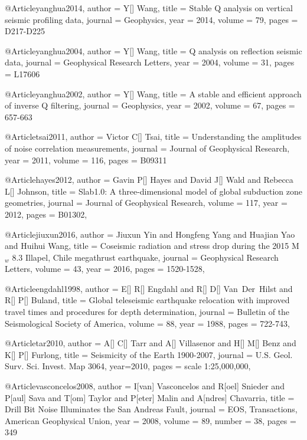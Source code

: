 @Article{yanghua2014,
  author = 	 {Y[] Wang},
  title = 	 {Stable Q analysis on vertical seismic profiling data},
  journal = 	 {Geophysics},
  year = 	 2014,
  volume =	 79,
  pages =	 {D217-D225}
}

@Article{yanghua2004,
  author = 	 {Y[] Wang},
  title = 	 {Q analysis on reflection seismic data},
  journal = 	 {Geophysical Research Letters},
  year = 	 2004,
  volume =	 31,
  pages =	 {L17606}
}

@Article{yanghua2002,
  author = 	 {Y[] Wang},
  title = 	 {A stable and efficient approach of inverse Q filtering},
  journal = 	 {Geophysics},
  year = 	 2002,
  volume = 67,
  pages =	 {657-663}
}

@Article{tsai2011,
  author = 	 {Victor C[] Tsai},
  title = 	 {Understanding the amplitudes of noise correlation measurements},
  journal = 	 {Journal of Geophysical Research},
  year = 	 2011,
  volume = 116,
  pages =	 {B09311}
}

@Article{hayes2012,
  author =	 { Gavin P[] Hayes and David J[] Wald and Rebecca L[] Johnson},
  title =	 {Slab1.0: A three-dimensional model of global subduction zone geometries},
  journal =	 {Journal of Geophysical Research},
  volume =	 117,
  year =	 2012,
  pages =	 {B01302},
}

@Article{jiuxun2016,
  author =	 { Jiuxun Yin and Hongfeng Yang and Huajian Yao and Huihui Wang},
  title =	 {Coseismic radiation and stress drop during the 2015 {M}$_w$ 8.3 {I}llapel, {C}hile megathrust earthquake},
  journal =	 {Geophysical Research Letters},
  volume =	 43,
  year =	 2016,
  pages =	 {1520-1528},
}

@Article{engdahl1998,
  author =	 {E[] R[] Engdahl and R[] D[]  Van~Der~Hilst and R[] P[] Buland},
  title =	 {Global teleseismic earthquake relocation with improved travel times and procedures for depth determination},
  journal =	 {Bulletin of the Seismological Society of America},
  volume =	 88,
  year =	 1988,
  pages =	 {722-743},
}

@Article{tar2010,
  author =	 {A[] C[] Tarr and A[] Villasenor and H[] M[] Benz and K[] P[] Furlong},
  title =	 {Seismicity of the {E}arth 1900-2007},
  journal =	 {U.S. Geol. Surv. Sci. Invest. Map 3064},
  year=2010,
  pages =	 {scale 1:25,000,000},
}

@Article{vasconcelos2008,
   author = { I[van] Vasconcelos and R[oel] Snieder and P[aul] Sava and T[om] Taylor and P[eter] Malin and A[ndres] Chavarria},
   title = {Drill Bit Noise Illuminates the {S}an {A}ndreas Fault},
   journal = {{EOS}, {T}ransactions, {A}merican {G}eophysical {U}nion},
   year = {2008},
   volume = {89},
   number = {38},
   pages = {349}
}

